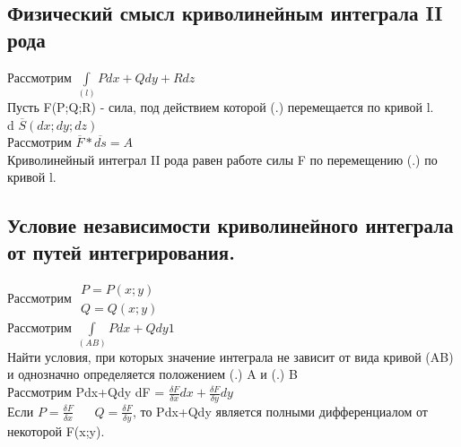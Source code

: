 \documentclass[12pt]{article}
\let\oldint\int
\renewcommand{\int}{\oldint\limits}
\begin{document}
  \subsection*{Физический смысл криволинейным интеграла II рода}
  Рассмотрим $\int_{(l)} Pdx+Qdy+Rdz$\\
  Пусть F(P;Q;R) - сила, под действием которой (.) перемещается по кривой l.\\
  d $\overline{S}(dx;dy;dz)$\\
  Рассмотрим $\overline{F}*\overline{ds}=A$\\
  Криволинейный интеграл II рода равен работе силы F по перемещению (.) по кривой l.
  \subsection{Условие независимости криволинейного интеграла от путей интегрирования.}
  Рассмотрим $\begin{matrix}
    P=P(x;y)\\
    Q=Q(x;y)
  \end{matrix}$\\
  Рассмотрим $\int_{(AB)}Pdx+Qdy \boxed{1}$\\
  Найти условия, при которых значение интеграла не зависит от вида кривой (AB) и однозначно определяется положением
  (.) A и (.) B\\
  Рассмотрим Pdx+Qdy \hspace{20pt} dF = $\frac{\delta F}{\delta x}dx + \frac{\delta F}{\delta y}dy$\\
  Если $P=\frac{\delta F}{\delta x} \hspace{20pt} Q=\frac{\delta F}{\delta y}$, то Pdx+Qdy является полными
  дифференциалом от некоторой F(x;y).\\
\end{document}
